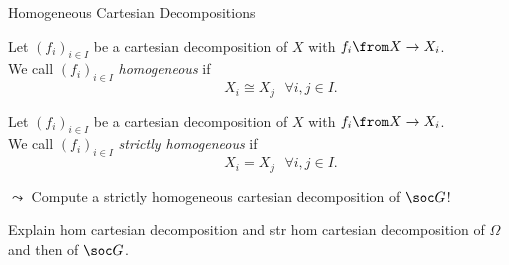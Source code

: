 
\begin{frame}{Homogeneous Cartesian Decompositions}
    \begin{defn}
        Let $(f_i)_{i \in I}$ be a cartesian decomposition of $X$
        with $f_i \from X \to X_i$.
        \\
        We call $(f_i)_{i \in I}$
        \emph{homogeneous}
        if
        \\
        \pause
        \vspace{-1em}
        \[
            \hspace{3em} X_i \cong X_j ~~~ \forall i, j \in I.
        \]
    \end{defn}
    \pause

    \begin{defn}
        Let $(f_i)_{i \in I}$ be a cartesian decomposition of $X$
        with $f_i \from X \to X_i$.
        \\
        We call $(f_i)_{i \in I}$
        \emph{strictly homogeneous}
        if
        \\
        \pause
        \vspace{-1em}
        \[
            \hspace{3em} X_i = X_j ~~~ \forall i, j \in I.
        \]
    \end{defn}
    \pause

    $\leadsto$
    Compute a strictly homogeneous cartesian decomposition of $\soc G$!
\end{frame}

\note
{
Explain hom cartesian decomposition and str hom cartesian decomposition of
$\Omega$ and then of $\soc G$.
}
